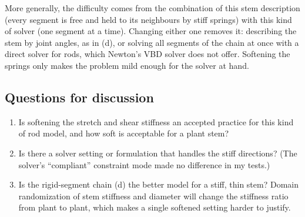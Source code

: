\documentclass[11pt,a4paper]{article}
\begin{document}
More generally, the difficulty comes from the combination of this stem description (every segment is free
and held to its neighbours by stiff springs) with this kind of solver (one segment at a time). Changing
either one removes it: describing the stem by joint angles, as in (d), or solving all segments of the chain
at once with a direct solver for rods, which Newton's VBD solver does not offer. Softening the springs only
makes the problem mild enough for the solver at hand.

\subsection{Questions for discussion}

\begin{enumerate}
  \item Is softening the stretch and shear stiffness an accepted practice for this kind of rod model, and
        how soft is acceptable for a plant stem?
  \item Is there a solver setting or formulation that handles the stiff directions? (The solver's
        ``compliant'' constraint mode made no difference in my tests.)
  \item Is the rigid-segment chain (d) the better model for a stiff, thin stem? Domain randomization of
        stem stiffness and diameter will change the stiffness ratio from plant to plant, which makes a
        single softened setting harder to justify.
\end{enumerate}
\end{document}
